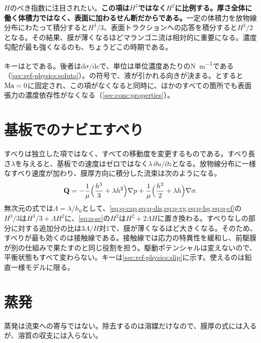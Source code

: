 $H$のべき指数に注目されたい。\textbf{この項は$H^{3}$ではなく$H^{2}$に比例する。厚さ全体に働く体積力ではなく、表面に加わるせん断だからである。}一定の体積力を放物線分布にわたって積分すると$H^{3}/3$、表面トラクションへの応答を積分すると$H^{2}/2$となる。その結果、膜が薄くなるほどマランゴニ流は相対的に重要になる。濃度勾配が最も強くなるのも、ちょうどこの時期である。

キーはとである。後者は$\mathrm{d}\sigma/\mathrm{d}c$で、単位は単位濃度あたりの\si{\newton\per\metre}である（\cref{sec:ref-physics:soluto}）。の符号で、液が引かれる向きが決まる。とすると$\mathrm{Ma} = 0$に固定され、この項がなくなると同時に、ほかのすべての箇所でも表面張力の濃度依存性がなくなる（\cref{sec:conc:properties}）。

\section{基板でのナビエすべり}
\label{sec:terms:slip}

すべりは独立した項ではなく、すべての移動度を変更するものである。すべり長さ$\lambda$を与えると、基板での速度はゼロではなく$\lambda\,\partial u/\partial z$となる。放物線分布に一様なすべり速度が加わり、膜厚方向に積分した流束は次のようになる。
%
\begin{equation}\label{eq:q-slip}
  \mathbf{Q} = -\frac{1}{\mu}\Big(\frac{h^{3}}{3} + \lambda h^{2}\Big)\nabla p
          + \frac{1}{\mu}\Big(\frac{h^{2}}{2} + \lambda h\Big)\nabla\sigma .
\end{equation}
%
無次元の式では$\Lambda = \lambda/h_0$として、\cref{eq:q-cap,eq:q-dis,eq:q-vg,eq:q-hg,eq:q-cf}の$H^{3}/3$は$H^{3}/3 + \Lambda H^{2}$に、\cref{eq:q-sc}の$H^{2}$は$H^{2} + 2\Lambda H$に置き換わる。すべりなしの部分に対する追加分の比は$3\Lambda/H$対1で、膜が薄くなるほど大きくなる。そのため、すべりが最も効くのは接触線である。接触線では応力の特異性を緩和し、前駆膜が別の仕組みで果たすのと同じ役割を担う。駆動ポテンシャルは変えないので、平衡状態もすべて変わらない。キーは\cref{sec:ref-physics:slip}に示す。使えるのは鉛直一様モデルに限る。

\section{蒸発}
\label{sec:terms:evaporation}

蒸発は流束への寄与ではない。除去するのは溶媒だけなので、膜厚の式には入るが、溶質の収支には入らない。

